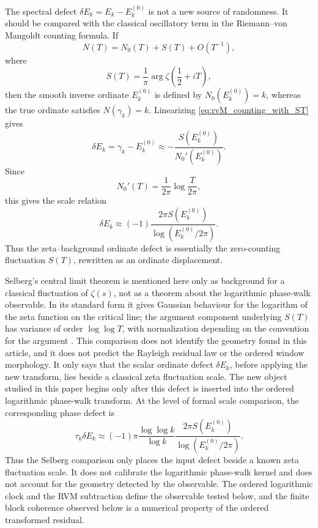 \documentclass[12pt]{article}
\numberwithin{equation}{section}
\begin{document}
\noindent The spectral defect \(\delta E_k=E_k-E_k^{(0)}\) is not a new source of randomness.  It should be compared with the classical oscillatory term in the Riemann--von Mangoldt counting formula.  If
\begin{equation}
N(T)
=
N_0(T)+S(T)+O(T^{-1}),
\label{eq:rvM_counting_with_ST}
\end{equation}
where
\begin{equation}
S(T)
=
\frac{1}{\pi}\arg \zeta\left(\frac12+iT\right),
\end{equation}
then the smooth inverse ordinate \(E_k^{(0)}\) is defined by \(N_0(E_k^{(0)})=k\), whereas the true ordinate satisfies \(N(\gamma_k)=k\).  Linearizing \eqref{eq:rvM_counting_with_ST} gives
\begin{equation}
\delta E_k
=
\gamma_k-E_k^{(0)}
\approx
-\frac{S(E_k^{(0)})}{N_0'(E_k^{(0)})}.
\end{equation}
Since
\begin{equation}
N_0'(T)
=
\frac{1}{2\pi}\log\frac{T}{2\pi},
\end{equation}
this gives the scale relation
\begin{equation}
\delta E_k
\approx
\left(-1\right)\frac{2\pi S(E_k^{(0)})}{\log(E_k^{(0)}/2\pi)}.
\label{eq:defect_ST_scale}
\end{equation}
Thus the zeta--background ordinate defect is essentially the zero-counting fluctuation \(S(T)\), rewritten as an ordinate displacement.


\noindent Selberg's central limit theorem is mentioned here only as background for a classical fluctuation of \(\zeta(s)\), not as a theorem about the logarithmic phase-walk observable.  In its standard form it gives Gaussian behaviour for the logarithm of the zeta function on the critical line; the argument component underlying \(S(T)\) has variance of order \(\log\log T\), with normalization depending on the convention for the argument \cite{Selberg1992,Tsang1984,RadziwillSoundararajan2017}.  This comparison does not identify the geometry found in this article, and it does not predict the Rayleigh residual law or the ordered window morphology.  It only says that the scalar ordinate defect \(\delta E_k\), before applying the new transform, lies beside a classical zeta fluctuation scale.  The new object studied in this paper begins only after this defect is inserted into the ordered logarithmic phase-walk transform.  At the level of formal scale comparison, the corresponding phase defect is
\begin{equation}
\tau_k\delta E_k
\approx
\left(-1\right)\pi\frac{\log\log k}{\log k}
\frac{2\pi S(E_k^{(0)})}{\log(E_k^{(0)}/2\pi)}.
\label{eq:proper_time_phase_defect_ST}
\end{equation}
Thus the Selberg comparison only places the input defect beside a known zeta fluctuation scale.  It does not calibrate the logarithmic phase-walk kernel and does not account for the geometry detected by the observable.  The ordered logarithmic clock and the RVM subtraction define the observable tested below, and the finite block coherence observed below is a numerical property of the ordered transformed residual.
\end{document}
